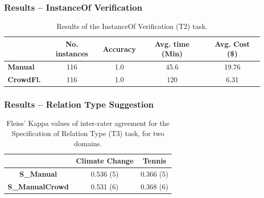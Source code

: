 \documentclass{beamer}
\begin{document}
\begin{frame}
  \frametitle{Results -- InstanceOf Verification}
    \begin{table}
    \small
    \center
    \begin{tabular}{|l|c|c|c|c|} \hline
    \textbf{}            &\textbf{No. instances}& \textbf{Accuracy} & \textbf{Avg. time (Min)}&\textbf{Avg. Cost (\$)} \\ \hline
    \textbf{Manual}      & 116 & 1.0  & 45.6 &  19.76\\ \hline
    \textbf{CrowdFl.} & 116 & 1.0  & 120 & 6.31 \\ \hline

    \end{tabular}
    \caption{Results of the InstanceOf Verification (T2) task.}
    \label{table:resInstanceOf}
    \end{table}
\end{frame}


\begin{frame}
  \frametitle{Results -- Relation Type Suggestion}
    \begin{table}
    \center
    \begin{tabular}{|c|c|c|} \hline
                                           & \textbf{Climate Change} & \textbf{Tennis}  \\ \hline
      \textbf{S\_Manual}                   & 0.536 (5)               & 0.366 (5)        \\ \hline
      \textbf{S\_ManualCrowd}              & 0.531 (6)               & 0.368 (6)        \\ \hline
    \end{tabular}
    \caption{Fleiss' Kappa values of inter-rater agreement for the Specification of Relation Type (T3) task, for two domains.}
    \label{table:eval_rel_sugg}
    \end{table}

\end{frame}
\end{document}
